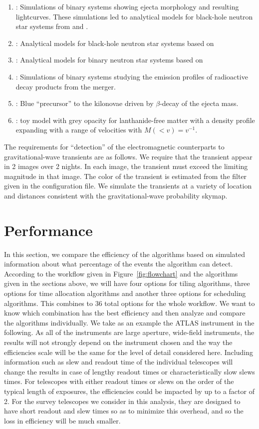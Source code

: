 \documentclass[twocolumn]{aastex62}
\begin{document}
\begin{enumerate}
\item \cite{TaHo2014}: Simulations of binary systems showing ejecta morphology and resulting lightcurves. These simulations led to analytical models for black-hole neutron star systems from \cite{KaKy2016} and \cite{DiUj2017}.
\item \cite{KaKy2016}: Analytical models for black-hole neutron star systems based on \cite{TaHo2014}
\item \cite{DiUj2017}: Analytical models for binary neutron star systems based on \cite{TaHo2014}
\item \cite{BaKa2016}: Simulations of binary systems studying the emission profiles of radioactive decay products from the merger.
\item \cite{MeBa2015}: Blue ``precursor'' to the kilonovae driven by $\beta$-decay of the ejecta mass.
\item \cite{Me2017}: toy model with grey opacity for lanthanide-free matter with a density profile expanding with a range of velocities with $M(< v) = v^{-1}$.
\end{enumerate}

The requirements for ``detection'' of the electromagnetic counterparts to gravitational-wave transients are as follows.
We require that the transient appear in 2 images over 2 nights.
In each image, the transient must exceed the limiting magnitude in that image.
The color of the transient is estimated from the filter given in the configuration file.
We simulate the transients at a variety of location and distances consistent with the gravitational-wave probability skymap.


\section{Performance}
\label{sec:performance}
In this section, we compare the efficiency of the algorithms based on simulated information about what percentage of the events the algorithm can detect. According to the workflow given in Figure~\ref{fig:flowchart} and the algorithms given in the sections above, we will have four options for tiling algorithms, three options for time allocation algorithms and another three options for scheduling algorithms. This combines to 36 total options for the whole workflow. We want to know which combination has the best efficiency and then analyze and compare the algorithms individually.
We take as an example the ATLAS instrument in the following. 
As all of the instruments are large aperture, wide-field instruments, the results will not strongly depend on the instrument chosen and the way the efficiencies scale will be the same for the level of detail considered here.
Including information such as slew and readout time of the individual telescopes will change the results in case of lengthy readout times or characteristically slow slews times.
For telescopes with either readout times or slews on the order of the typical length of exposures, the efficiencies could be impacted by up to a factor of 2.
For the survey telescopes we consider in this analysis, they are designed to have short readout and slew times so as to minimize this overhead, and so the loss in efficiency will be much smaller.
\end{document}
